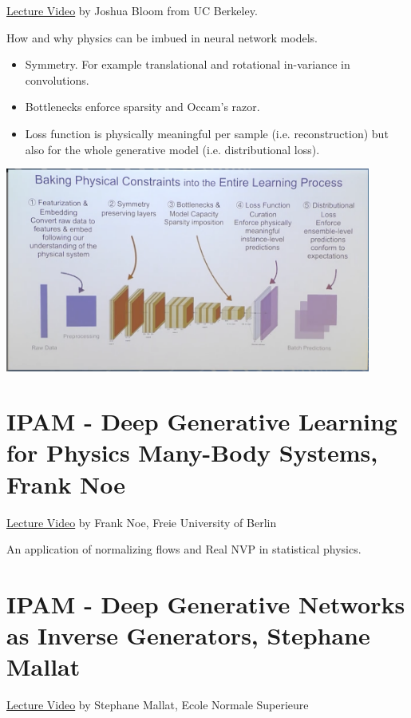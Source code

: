 \documentclass{article}
\begin{document}
\href{http://www.ipam.ucla.edu/abstract/?tid=16152&pcode=MLPWS1}{Lecture Video} by Joshua Bloom from UC Berkeley.

How and why physics can be imbued in neural network models.

\begin{itemize}
    \item Symmetry. For example translational and rotational in-variance in convolutions.
    \item Bottlenecks enforce sparsity and Occam's razor.
    \item Loss function is physically meaningful per sample (i.e. reconstruction) but also for the whole generative model (i.e. distributional loss).
\end{itemize}

\includegraphics[width=0.9\textwidth]{images/Physics Inspired ML.png}

\section{IPAM - Deep Generative Learning for Physics Many-Body Systems, Frank Noe}

\href{http://www.ipam.ucla.edu/programs/workshops/workshop-i-from-passive-to-active-generative-and-reinforcement-learning-with-physics/?tab=schedule}{Lecture Video} by Frank Noe, Freie University of Berlin

An application of normalizing flows \parencite{Rezende2015VariationalFlows} and Real NVP \parencite{Dinh2016DensityNVP} in statistical physics. 

\section{IPAM - Deep Generative Networks as Inverse Generators, Stephane Mallat}

\href{http://www.ipam.ucla.edu/abstract/?tid=14547&pcode=DLT2018}{Lecture Video} by Stephane Mallat, Ecole Normale Superieure
\end{document}

